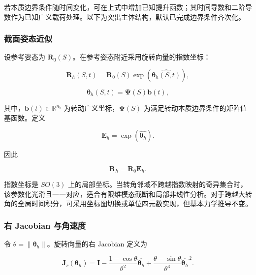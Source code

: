 若本质边界条件随时间变化，可在上式中增加已知提升函数；其时间导数和二阶导数作为已知广义载荷处理。以下为突出主体结构，默认已完成边界条件齐次化。

\subsubsection{截面姿态近似}\label{sec:galerkin-2-2-2}

设参考姿态为 \(\mathbf{R}_{0}(S)\)。在参考姿态附近采用旋转向量的指数坐标：

\begin{equation}
\label{eq:galerkin-2-3}
\mathbf{R}_{h}(S,t) = \mathbf{R}_{0}(S)\exp\left( \widehat{\bm{\theta}_{h}(S,t)} \right),
\end{equation}

\begin{equation}
\label{eq:galerkin-2-4}
\bm{\theta}_{h}(S,t) = \bm{\Psi}(S)\mathbf{b}(t),
\end{equation}

其中，\(\mathbf{b}(t) \in \mathbb{R}^{n_{b}}\) 为转动广义坐标，\(\bm{\Psi}(S)\) 为满足转动本质边界条件的矩阵值基函数。定义

\begin{equation}
\label{eq:galerkin-2-5}
\mathbf{E}_{h} = \exp\left( \widehat{\bm{\theta}_{h}} \right).
\end{equation}

因此

\begin{equation}
\label{eq:galerkin-2-6}
\mathbf{R}_{h} = \mathbf{R}_{0}\mathbf{E}_{h}.
\end{equation}

指数坐标是 \(SO(3)\) 上的局部坐标。当转角邻域不跨越指数映射的奇异集合时，该参数化光滑且一一对应，适合有限维模态截断和局部非线性分析。对于跨越大转角的全局时间积分，可采用坐标图切换或单位四元数实现，但基本力学推导不变。

\subsubsection{右 Jacobian 与角速度}\label{sec:galerkin-2-2-3}

令 \(\theta = \parallel \bm{\theta}_{h} \parallel\)。旋转向量的右 Jacobian 定义为

\begin{equation}
\label{eq:galerkin-2-7}
\mathbf{J}_{r}\left( \bm{\theta}_{h} \right) = \mathbf{I} - \frac{1 - \cos\theta}{\theta^{2}}\widehat{\bm{\theta}_{h}} + \frac{\theta - \sin\theta}{\theta^{3}}{\widehat{\bm{\theta}_{h}}}^{\, 2}.
\end{equation}

